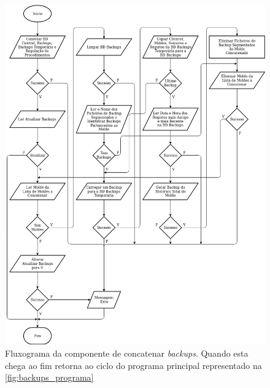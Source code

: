 \documentclass[11pt,twoside,a4paper]{report}
\begin{document}
\begin{figure}[H]
	\begin{center}
		\includegraphics[width=1\textwidth]{fluxograma_backups_concatenar02} %
		\caption[Fluxograma da componente de concatenar \textit{backups}]{Fluxograma da componente de concatenar \textit{backups}. Quando esta chega ao fim retorna ao ciclo do programa principal representado na \autoref{fig:backups_programa}}
		\label{fig:backups_concatenar}
	\end{center}
\end{figure}
\end{document}
